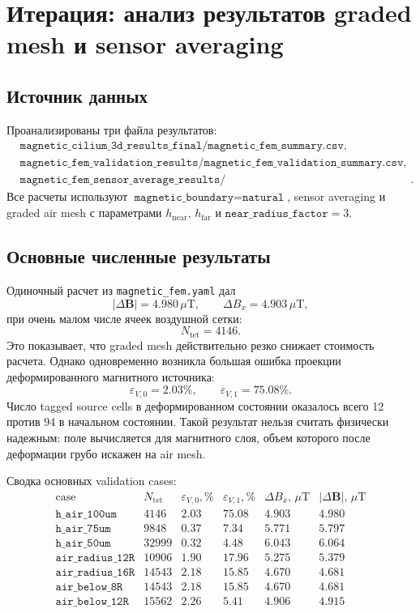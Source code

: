 \documentclass[12pt,a4paper]{article}
\begin{document}
\section{Итерация: анализ результатов graded mesh и sensor averaging}

\subsection*{Источник данных}

Проанализированы три файла результатов:
\[
\begin{aligned}
&\texttt{magnetic\_cilium\_3d\_results\_final/magnetic\_fem\_summary.csv},\\
&\texttt{magnetic\_fem\_validation\_results/magnetic\_fem\_validation\_summary.csv},\\
&\texttt{magnetic\_fem\_sensor\_average\_results/magnetic\_sensor\_average\_validation\_summary.csv}.
\end{aligned}
\]
Все расчеты используют \(\texttt{magnetic\_boundary}=\texttt{natural}\),
sensor averaging и graded air mesh с параметрами \(h_{\mathrm{near}}\),
\(h_{\mathrm{far}}\) и \(\texttt{near\_radius\_factor}=3\).

\subsection*{Основные численные результаты}

Одиночный расчет из \texttt{magnetic\_fem.yaml} дал
\[
    |\Delta\mathbf B| = 4.980\,\mu\mathrm{T},
    \qquad
    \Delta B_x = 4.903\,\mu\mathrm{T},
\]
при очень малом числе ячеек воздушной сетки:
\[
    N_{\mathrm{tet}} = 4146.
\]
Это показывает, что graded mesh действительно резко снижает стоимость расчета.
Однако одновременно возникла большая ошибка проекции деформированного
магнитного источника:
\[
    \varepsilon_{V,0}=2.03\%,\qquad
    \varepsilon_{V,1}=75.08\%.
\]
Число tagged source cells в деформированном состоянии оказалось всего 12 против
94 в начальном состоянии. Такой результат нельзя считать физически надежным:
поле вычисляется для магнитного слоя, объем которого после деформации грубо
искажен на air mesh.

Сводка основных validation cases:
\[
\begin{array}{lrrrrr}
\text{case} &
N_{\mathrm{tet}} &
\varepsilon_{V,0},\% &
\varepsilon_{V,1},\% &
\Delta B_x,\,\mu\mathrm{T} &
|\Delta\mathbf B|,\,\mu\mathrm{T}
\\
\hline
\texttt{h\_air\_100um} & 4146  & 2.03 & 75.08 & 4.903 & 4.980\\
\texttt{h\_air\_75um}  & 9848  & 0.37 & 7.34  & 5.771 & 5.797\\
\texttt{h\_air\_50um}  & 32999 & 0.32 & 4.48  & 6.043 & 6.064\\
\texttt{air\_radius\_12R} & 10906 & 1.90 & 17.96 & 5.275 & 5.379\\
\texttt{air\_radius\_16R} & 14543 & 2.18 & 15.85 & 4.670 & 4.681\\
\texttt{air\_below\_8R}   & 14543 & 2.18 & 15.85 & 4.670 & 4.681\\
\texttt{air\_below\_12R}  & 15562 & 2.26 & 5.41  & 4.906 & 4.915
\end{array}
\]
\end{document}
